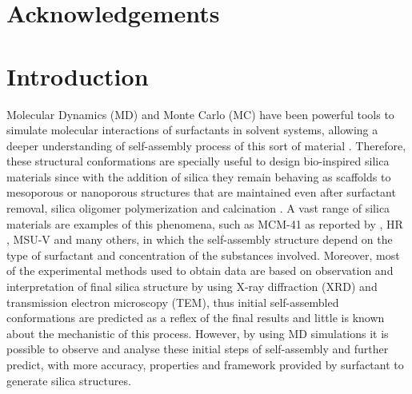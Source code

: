 \documentclass[10pt,a4paper,twoside]{article}
\begin{document}
\vfill
\newpage

\setcounter{tocdepth}{3}
\tableofcontents



\vfill
\newpage

\section{Acknowledgements}

\vfill
\newpage

\section{Introduction}
 
Molecular Dynamics (MD) and Monte Carlo (MC) have been powerful tools to simulate molecular interactions of surfactants in solvent systems, allowing a deeper understanding of self-assembly process of this sort of material \cite{someone}. Therefore, these structural conformations are specially useful to design bio-inspired silica materials \cite{bioinsp} since with the addition of silica they remain behaving as scaffolds to mesoporous or nanoporous structures that are maintained even after surfactant removal, silica oligomer polymerization and calcination \cite{silica1}.
A vast range of silica materials are examples of this phenomena, such as MCM-41 as reported by , HR \cite{hrib}, MSU-V \cite{msuv} and many others, in which the self-assembly structure depend on the type of surfactant and concentration of the substances involved. Moreover, most of the experimental methods used to obtain data are based on observation and interpretation of final silica structure by using X-ray diffraction (XRD) and transmission electron microscopy (TEM), thus initial self-assembled conformations are predicted as a reflex of the final results and little is known about the mechanistic of this process. However, by using MD simulations it is possible to observe and analyse these initial steps of self-assembly and further predict, with more accuracy, properties and framework provided by surfactant \cite{lipid} to generate silica structures.
\end{document}
